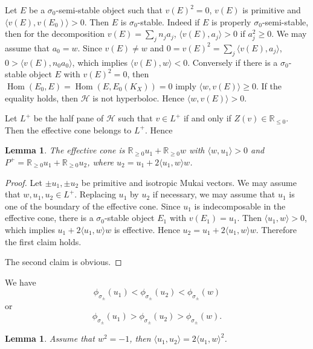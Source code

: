 \documentclass[leqno,11pt]{amsart}
\def\R{\ensuremath{\mathbb{R}}}
\def\Hom{\mathop{\mathrm{Hom}}\nolimits}
\newtheorem{Lem}[Thm]{Lemma}
\theoremstyle{definition}
\def\R{\ensuremath{\mathbb{R}}}
\def\HH{\ensuremath{\mathcal H}}
\begin{document}
Let $E$ be a $\sigma_0$-semi-stable object such that
$v(E)^2=0$, $v(E)$ is primitive and
$\langle v(E),v(E_0) \rangle>0$.
Then $E$ is $\sigma_0$-stable.
Indeed if $E$ is properly $\sigma_0$-semi-stable, then
for the decomposition $v(E)=\sum_j n_j a_j$,
$\langle v(E),a_j \rangle >0$ if $a_j^2 \geq 0$.
We may assume that $a_0=w$.
Since $v(E) \ne w$ and
$0=v(E)^2=\sum_j \langle v(E),a_j \rangle$,
$0 > \langle v(E),n_0 a_0 \rangle$, which implies
$\langle v(E),w \rangle<0$.
Conversely if there is a $\sigma_0$-stable object $E$ with 
$v(E)^2=0$, then 
$\Hom(E_0,E)=\Hom(E,E_0(K_X))=0$ imply
$\langle w,v(E) \rangle \geq 0$.
If the equality holds, then 
$\HH$ is not hyperboloc.
Hence $\langle w, v(E) \rangle>0$.

Let $L^+$ be the half pane of $\HH$ such  that
$v \in L^+$ if and only if $Z(v) \in \R_{\leq 0}$. 
Then the effective cone belongs to $L^+$.
Hence
\begin{Lem}
The effective cone is $\R_{\geq 0} u_1+\R_{\geq 0} w$ with 
$\langle w,u_1 \rangle>0$
and $P^+=\R_{\geq 0} u_1+\R_{\geq 0}u_2$,
where $u_2=u_1+2\langle u_1,w \rangle w$. 
\end{Lem}

\begin{proof}
Let $\pm u_1,\pm u_2$ be primitive
and isotropic Mukai vectors.
We may assume that $w,u_1,u_2 \in L^+$.
Replacing $u_1$ by $u_2$ if necessary, we may assume that
$u_1$ is one of the boundary of the effective cone.
Since $u_1$ is indecomposable in the effective cone,
there is a $\sigma_0$-stable object $E_1$ with
$v(E_1)=u_1$. Then $\langle u_1,w \rangle>0$, which implies
$u_1+2\langle u_1,w \rangle w$ is effective.
Hence $u_2=u_1+2\langle u_1,w \rangle w$.
Therefore the first claim holds.

The second claim is obvious.
\end{proof}

We have 
\begin{equation}
\phi_{\sigma_\pm}(u_1) < \phi_{\sigma_\pm}(u_2)<
\phi_{\sigma_\pm}(w)
\end{equation}
or
\begin{equation}
\phi_{\sigma_\pm}(u_1) > \phi_{\sigma_\pm}(u_2)>
\phi_{\sigma_\pm}(w).
\end{equation}

\begin{Lem}
Assume that $w^2=-1$, then
$\langle u_1,u_2 \rangle=2\langle u_1,w \rangle^2$.
\end{Lem}
\end{document}
